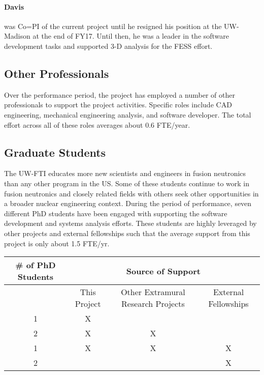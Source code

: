 \paragraph{Davis} was Co=PI of the current project until he resigned his
position at the UW-Madison at the end of FY17.  Until then, he was a leader in
the software development tasks and supported 3-D analysis for the \gls{FESS}
effort.

\subsection{Other Professionals}

Over the performance period, the project has employed a number of other
professionals to support the project activities.  Specific roles include CAD
engineering, mechanical engineering analysis, and software developer.  The
total effort across all of these roles averages about 0.6 FTE/year.

\subsection{Graduate Students}

The \gls{UW-FTI} educates more new scientists and engineers in fusion
neutronics than any other program in the US.  Some of these students continue
to work in fusion neutronics and closely related fields with others seek other
opportunities in a broader nuclear engineering context. During the period of
performance, seven different PhD students have been engaged with supporting
the software development and systems analysis efforts.  These students are
highly leveraged by other projects and external fellowships such that the
average support from this project is only about 1.5 FTE/yr.

\begin{center}
  \begin{tabular}{|c|c|c|c|}\hline
    \# of PhD Students & \multicolumn{3}{c|}{Source of Support}\\\hline
    & This Project & Other Extramural Research Projects & External Fellowships \\\hline
    1 & X &   &   \\\hline
    2 & X & X &   \\\hline
    1 & X & X & X \\\hline
    2 &   &   & X \\\hline
  \end{tabular}
\end{center}

